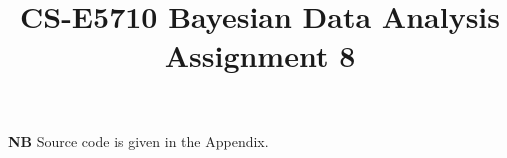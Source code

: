\documentclass{article}
\begin{document}
\title{CS-E5710 Bayesian Data Analysis\\Assignment 8 }                  
\maketitle



\textbf{NB} Source code is given in the Appendix.
\end{document}

